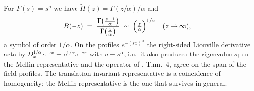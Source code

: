 \begin{example}\label{ex:stable-signaling}
For $F(s) = s^\alpha$ we have $\tilde H(z) = \Gamma(z/\alpha)/\alpha$ and
\[
  B(-z) \;=\; \frac{\Gamma\bigl(\tfrac{z+1}{\alpha}\bigr)}{\Gamma\bigl(\tfrac{z}{\alpha}\bigr)}
  \;\sim\; \Bigl(\tfrac{z}{\alpha}\Bigr)^{1/\alpha} \quad (z \to \infty),
\]
a symbol of order $1/\alpha$. On the profiles $e^{-(sx)^\alpha}$ the right-sided Liouville
derivative acts by $D^{1/\alpha}_{x,-} e^{-cx} = c^{1/\alpha} e^{-cx}$ with $c = s^\alpha$,
i.e.\ it also produces the eigenvalue $s$; so the Mellin representative and the operator of
, Thm.~4, agree on the span of the field profiles. The
translation-invariant representative is a coincidence of homogeneity; the Mellin
representative is the one that survives in general.
\end{example}

